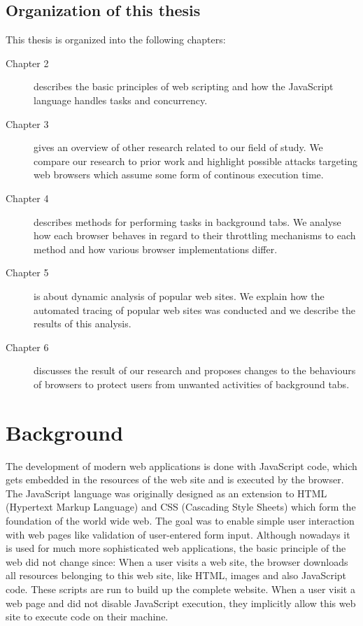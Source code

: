 \documentclass[
	ruledheaders=section,%
	class=report,%
	thesis={type=bachelor},%
	accentcolor=9c,%
	custommargins=true,%
	marginpar=false,%
	parskip=half-,%
	fontsize=11pt,%
]{tudapub}
\begin{document}
  \section{Organization of this thesis}

  This thesis is organized into the following chapters:

  \begin{description}
  \item[Chapter 2] describes the basic principles of web scripting and how the JavaScript language handles tasks and concurrency.
    
  \item[Chapter 3] gives an overview of other research related to our field of study. We compare our research to prior work and highlight possible attacks targeting web browsers which assume some form of continous execution time.
    
  \item[Chapter 4] describes methods for performing tasks in background tabs. We analyse how each browser behaves in regard to their throttling mechanisms to each method and how various browser implementations differ.
    
  \item[Chapter 5] is about dynamic analysis of popular web sites. We explain how the automated tracing of popular web sites was conducted and we describe the results of this analysis.
    
  \item[Chapter 6] discusses the result of our research and proposes changes to the behaviours of browsers to protect users from unwanted activities of background tabs.
  \end{description} 

  
  \newpage
  \chapter{Background}
  
  The development of modern web applications is done with JavaScript code, which gets embedded in the resources of the web site and is executed by the browser. The JavaScript language was originally designed as an extension to HTML (Hypertext Markup Language) and CSS (Cascading Style Sheets) which form the foundation of the world wide web. The goal was to enable simple user interaction with web pages like validation of user-entered form input. Although nowadays it is used for much more sophisticated web applications, the basic principle of the web did not change since: When a user visits a web site, the browser downloads all resources belonging to this web site, like HTML, images and also JavaScript code. These scripts are run to build up the complete website. When a user visit a web page and did not disable JavaScript execution, they implicitly allow this web site to execute code on their machine.
\end{document}
